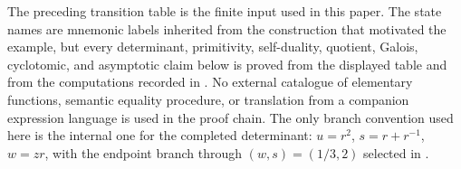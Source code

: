 \begin{remark}\label{rem:kernel-import-ledger}
The preceding transition table is the finite input used in this paper.
The state names are mnemonic labels inherited from the construction that
motivated the example, but every determinant, primitivity,
self-duality, quotient, Galois, cyclotomic, and asymptotic claim below
is proved from the displayed table and from the computations recorded in
.  No external catalogue of elementary
functions, semantic equality procedure, or translation from a companion
expression language is used in the proof chain.  The only branch
convention used here is the internal one for the completed determinant:
\(u=r^2\), \(s=r+r^{-1}\), \(w=zr\), with the endpoint branch through
\((w,s)=(1/3,2)\) selected in
.

\end{remark}


